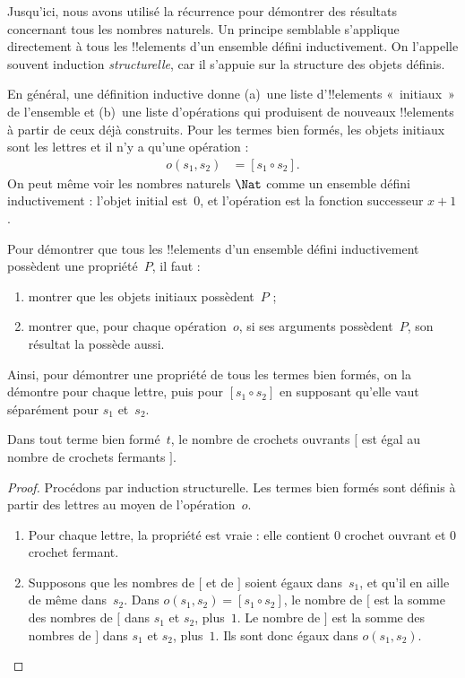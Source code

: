 \documentclass[../../../include/open-logic-section]{subfiles}
\begin{document}


Jusqu'ici, nous avons
utilisé la récurrence
pour démontrer des
résultats concernant
tous les nombres
naturels. Un principe
semblable s'applique
directement à tous
les !!{element}s
d'un ensemble défini
inductivement. On
l'appelle souvent
induction
\emph{structurelle},
car il s'appuie
sur la structure
des objets définis.

En général, une
définition inductive
donne (a)~une liste
d'!!{element}s
«~initiaux~» de
l'ensemble et
(b)~une liste
d'opérations qui
produisent de
nouveaux
!!{element}s
à partir de
ceux déjà construits.
Pour les termes
bien formés,
les objets initiaux
sont les lettres
et il n'y a
qu'une opération :
\begin{align*}
  o(s_1,s_2)
    &= [s_1 \circ s_2].
\end{align*}
On peut même voir
les nombres naturels
$\Nat$ comme un
ensemble défini
inductivement :
l'objet initial
est~$0$, et
l'opération est
la fonction
successeur $x+1$.

Pour démontrer que
tous les
!!{element}s
d'un ensemble
défini inductivement
possèdent une
propriété~$P$,
il faut :
\begin{enumerate}
\item montrer que
  les objets initiaux
  possèdent~$P$ ;
\item montrer que,
  pour chaque
  opération~$o$,
  si ses arguments
  possèdent~$P$,
  son résultat
  la possède aussi.
\end{enumerate}
Ainsi, pour démontrer
une propriété de
tous les termes
bien formés,
on la démontre
pour chaque lettre,
puis pour
$[s_1 \circ s_2]$
en supposant
qu'elle vaut
séparément pour
$s_1$ et~$s_2$.

\begin{prop}
  Dans tout terme
  bien formé~$t$,
  le nombre de
  crochets ouvrants
  $[$ est égal
  au nombre de
  crochets fermants
  $]$.
\end{prop}

\begin{proof}
Procédons par
induction structurelle.
Les termes bien
formés sont définis
à partir des lettres
au moyen de
l'opération~$o$.
\begin{enumerate}
\item Pour chaque
  lettre, la
  propriété est
  vraie : elle
  contient $0$
  crochet ouvrant
  et $0$ crochet
  fermant.
\item Supposons
  que les nombres
  de $[$ et de
  $]$ soient égaux
  dans~$s_1$,
  et qu'il en
  aille de même
  dans~$s_2$.
  Dans
  $o(s_1,s_2)
  = [s_1 \circ s_2]$,
  le nombre de
  $[$ est la
  somme des nombres
  de $[$ dans
  $s_1$ et $s_2$,
  plus~$1$.
  Le nombre de
  $]$ est la
  somme des nombres
  de $]$ dans
  $s_1$ et $s_2$,
  plus~$1$.
  Ils sont donc
  égaux dans
  $o(s_1,s_2)$.
\end{enumerate}
\end{proof}
\end{document}

